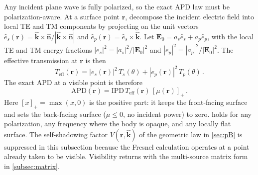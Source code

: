 \documentclass[journal,twocolumn,10pt]{IEEEtran}
\newcommand{\khat}{\hat{\bm{k}}}
\newcommand{\nhat}{\hat{\bm{n}}}
\newcommand{\rr}{\mathbf{r}}
\newcommand{\EE}{\mathbf{E}}
\newcommand{\IPD}{\mathrm{IPD}}
\newcommand{\APD}{\mathrm{APD}}
\newcommand{\Teff}{T_{\mathrm{eff}}}
\newcommand{\pospart}[1]{\left[#1\right]_{+}}
\newcommand{\Vis}{V}
\begin{document}
Any incident plane wave is fully polarized, so the exact \gls{APD}
law must be polarization-aware. At a surface point
$\rr$, decompose the incident electric field into local TE and TM
components by projecting on the unit vectors
$\hat{e}_s(\rr) = \khat \times \nhat / |\khat \times \nhat|$ and
$\hat{e}_p(\rr) = \hat{e}_s \times \khat$. Let $\EE_0 = a_s \hat{e}_s + a_p \hat{e}_p$, with the local TE and TM
energy fractions $|e_s|^2 = |a_s|^2 / |\EE_0|^2$ and
$|e_p|^2 = |a_p|^2 / |\EE_0|^2$. The effective transmission at $\rr$
is then
\begin{equation}\label{eq:Teff}
  \Teff(\rr) = |e_s(\rr)|^2 \, T_s(\theta) + |e_p(\rr)|^2 \,
  T_p(\theta)\, .
\end{equation}
The exact \gls{APD} at a visible point is therefore
\begin{equation}\label{eq:Sab-exact}
  \APD(\rr) = \IPD \, \Teff(\rr) \, \pospart{\mu(\rr)} \,.
\end{equation}
Here $\pospart{x} = \max(x, 0)$ is the positive part: it keeps the
front-facing surface and sets the back-facing surface ($\mu \le 0$, no
incident power) to zero.
 holds for any polarization, any frequency where
the body is opaque, and any locally flat surface. The self-shadowing
factor $\Vis(\rr,\khat)$ of the geometric law in \cref{sec:pB} is
suppressed in this subsection because the Fresnel calculation
operates at a point already taken to be visible. Visibility returns
with the multi-source matrix form in \cref{subsec:matrix}.
\end{document}
